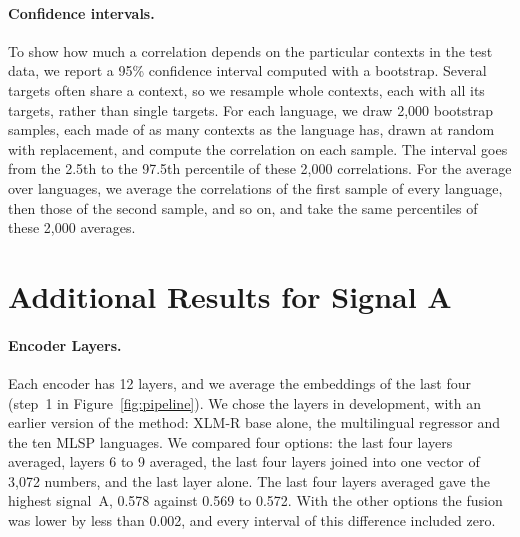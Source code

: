 \documentclass[11pt]{article}
\begin{document}
\paragraph{Confidence intervals.} To show how much a %
correlation depends on the particular contexts in the test data, we report a 95\% confidence
interval computed with a bootstrap. Several targets often share a context, so we resample whole %
contexts, each with all its targets, rather than single targets. For each language, we draw 2{,}000 %
bootstrap samples, each made of as many contexts as the language has, drawn at random with
replacement, and compute the correlation on each sample. The interval goes from the 2.5th to the
97.5th percentile of these 2{,}000 correlations. For the average over languages, we average the %
correlations of the first sample of every language, then those of the second sample, and so on, and
take the same percentiles of these 2{,}000 averages.

\section{Additional Results for Signal A}
\label{sec:appendix-signal-a}

\paragraph{Encoder Layers.} Each encoder has 12 layers, and we average the embeddings of the last %
four (step~1 in Figure~\ref{fig:pipeline}). We chose the layers in development, with an earlier %
version of the method: XLM-R base
alone, the multilingual regressor and the ten MLSP languages. We compared four options: the last %
four layers averaged, layers 6 to 9 averaged, the last four layers joined into one vector of
3{,}072 numbers, and the last layer alone. The last four layers averaged gave the highest %
signal~A, 0.578 against 0.569 to 0.572. With the other options the fusion was lower by less than %
0.002, and every interval of this difference included zero.
\end{document}
